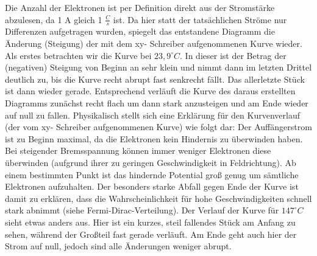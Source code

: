 Die Anzahl der Elektronen ist per Definition direkt aus der Stromstärke abzulesen,
da 1 A gleich 1 $\frac{C}{s}$ ist.
Da hier statt der tatsächlichen Ströme nur Differenzen aufgetragen wurden,
spiegelt das entstandene Diagramm die Änderung (Steigung) der mit dem xy-
Schreiber aufgenommenen Kurve wieder.
Als erstes betrachten wir die Kurve bei $23,9^\circ C$. In dieser ist der Betrag der (negativen)
Steigung von Beginn an sehr klein und nimmt dann im letzten Drittel
deutlich zu, bis die Kurve recht abrupt fast senkrecht fällt. Das allerletzte Stück
ist dann wieder gerade.
Entsprechend verläuft die Kurve des daraus erstellten Diagramms zunächst
recht flach um dann stark anzusteigen und am Ende wieder auf null zu fallen.
Physikalisch stellt sich eine Erklärung für den Kurvenverlauf (der vom xy-
Schreiber aufgenommenen Kurve) wie folgt dar:
Der Auffängerstrom ist zu Beginn maximal,
da die Elektronen kein Hindernis zu überwinden haben. Bei steigender Bremsspannung
können immer weniger Elektronen diese überwinden (aufgrund ihrer
zu geringen Geschwindigkeit in Feldrichtung). Ab einem bestimmten Punkt ist das hindernde
Potential groß genug um sämtliche Elektronen aufzuhalten.
Der besonders starke Abfall gegen Ende der
Kurve ist damit zu erklären, dass die Wahrscheinlichkeit für hohe Geschwindigkeiten
schnell stark abnimmt (siehe Fermi-Dirac-Verteilung).
Der Verlauf der Kurve für $147^\circ C$ sieht etwas anders aus. Hier ist ein kurzes,
steil fallendes Stück am Anfang zu sehen, während der Großteil fast gerade verläuft. Am
Ende geht auch hier der Strom auf null, jedoch sind alle Änderungen weniger
abrupt.
